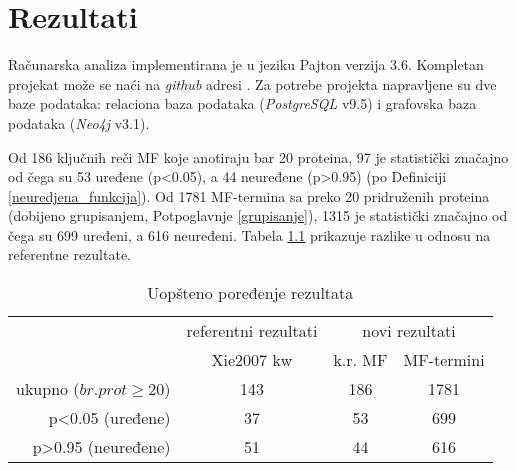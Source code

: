 
\chapter{Rezultati} %

\label{Rezultati} %

Računarska analiza implementirana je u jeziku Pajton  verzija 3.6.
Kompletan projekat može se naći na \textit{github} adresi \cite{projekat}. Za
potrebe projekta napravljene su dve baze podataka: relaciona baza podataka
(\textit{PostgreSQL} v9.5) i grafovska baza podataka (\textit{Neo4j} v3.1).

Od 186 ključnih reči MF koje anotiraju bar 20 proteina, 97 je statistički
značajno od čega su 53 uređene (p<0.05), a 44 neuređene (p>0.95) (po Definiciji
\ref{neuredjena_funkcija}).  Od 1781 MF-termina sa preko 20 pridruženih
proteina (dobijeno grupisanjem, Potpoglavnje \ref{grupisanje}), 1315 je
statistički značajno od čega su 699 uređeni, a 616 neuređeni.  Tabela
\ref{tab:kw_uopsteno} prikazuje razlike u odnosu na referentne rezultate.

\begin{table}[htpb]
\begin{tabular}{|r|c|c|c|}
  \hline
                     & \small referentni rezultati  & \multicolumn{2}{c|}{ novi rezultati} \\
                     & Xie2007 kw & k.r. MF  & MF-termini                  \\
  \hline
  ukupno ($br. prot\ge20$)     & 143        & 186    & 1781                        \\
  p<0.05 (uređene)   & 37         & 53     & 699                         \\
  p>0.95 (neuređene) & 51         & 44     & 616                         \\
  \hline
\end{tabular}
  \centering
  \caption{Uopšteno poređenje rezultata}
  \label{tab:kw_uopsteno}
\end{table}

